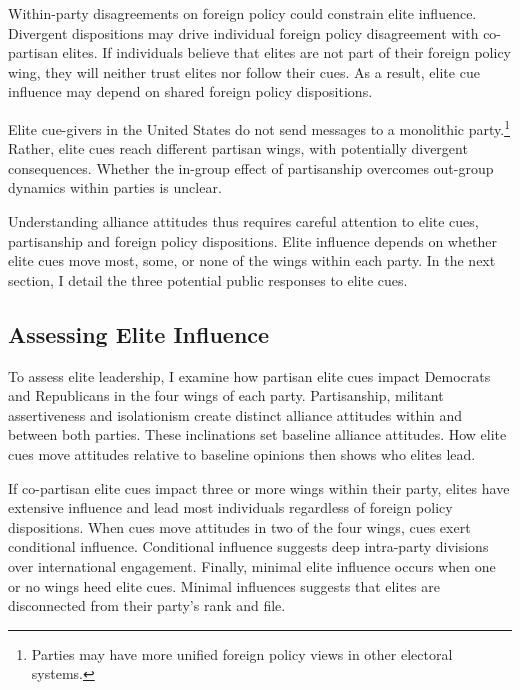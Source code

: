 \documentclass[12pt]{article}
\begin{document}


Within-party disagreements on foreign policy could constrain elite influence. 
Divergent dispositions may drive individual foreign policy disagreement with co-partisan elites.
If individuals believe that elites are not part of their foreign policy wing, they will neither trust elites nor follow their cues. 
As a result, elite cue influence may depend on shared foreign policy dispositions.


Elite cue-givers in the United States do not send messages to a monolithic party.\footnote{Parties may have more unified foreign policy views in other electoral systems.}
Rather, elite cues reach different partisan wings, with potentially divergent consequences. 
Whether the in-group effect of partisanship overcomes out-group dynamics within parties is unclear. 


Understanding alliance attitudes thus requires careful attention to elite cues, partisanship and foreign policy dispositions. 
Elite influence depends on whether elite cues move most, some, or none of the wings within each party. 
In the next section, I detail the three potential public responses to elite cues. 




\subsection{Assessing Elite Influence}


To assess elite leadership, I examine how partisan elite cues impact Democrats and Republicans in the four wings of each party.
Partisanship, militant assertiveness and isolationism create distinct alliance attitudes within and between both parties. 
These inclinations set baseline alliance attitudes. 
How elite cues move attitudes relative to baseline opinions then shows who elites lead. 


If co-partisan elite cues impact three or more wings within their party, elites have extensive influence and lead most individuals regardless of foreign policy dispositions. 
When cues move attitudes in two of the four wings, cues exert conditional influence. 
Conditional influence suggests deep intra-party divisions over international engagement. 
Finally, minimal elite influence occurs when one or no wings heed elite cues.
Minimal influences suggests that elites are disconnected from their party's rank and file.
\end{document}
